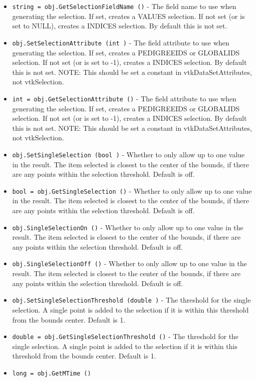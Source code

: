 \begin{itemize}
\item  \verb|string = obj.GetSelectionFieldName ()| -  The field name to use when generating the selection.
 If set, creates a VALUES selection.
 If not set (or is set to NULL), creates a INDICES selection.
 By default this is not set.

\item  \verb|obj.SetSelectionAttribute (int )| -  The field attribute to use when generating the selection.
 If set, creates a PEDIGREEIDS or GLOBALIDS selection.
 If not set (or is set to -1), creates a INDICES selection.
 By default this is not set.
 NOTE: This should be set a constant in vtkDataSetAttributes,
 not vtkSelection.

\item  \verb|int = obj.GetSelectionAttribute ()| -  The field attribute to use when generating the selection.
 If set, creates a PEDIGREEIDS or GLOBALIDS selection.
 If not set (or is set to -1), creates a INDICES selection.
 By default this is not set.
 NOTE: This should be set a constant in vtkDataSetAttributes,
 not vtkSelection.

\item  \verb|obj.SetSingleSelection (bool )| -  Whether to only allow up to one value in the result.
 The item selected is closest to the center of the bounds,
 if there are any points within the selection threshold.
 Default is off.

\item  \verb|bool = obj.GetSingleSelection ()| -  Whether to only allow up to one value in the result.
 The item selected is closest to the center of the bounds,
 if there are any points within the selection threshold.
 Default is off.

\item  \verb|obj.SingleSelectionOn ()| -  Whether to only allow up to one value in the result.
 The item selected is closest to the center of the bounds,
 if there are any points within the selection threshold.
 Default is off.

\item  \verb|obj.SingleSelectionOff ()| -  Whether to only allow up to one value in the result.
 The item selected is closest to the center of the bounds,
 if there are any points within the selection threshold.
 Default is off.

\item  \verb|obj.SetSingleSelectionThreshold (double )| -  The threshold for the single selection.
 A single point is added to the selection if it is within
 this threshold from the bounds center.
 Default is 1.

\item  \verb|double = obj.GetSingleSelectionThreshold ()| -  The threshold for the single selection.
 A single point is added to the selection if it is within
 this threshold from the bounds center.
 Default is 1.

\item  \verb|long = obj.GetMTime ()|

\end{itemize}
